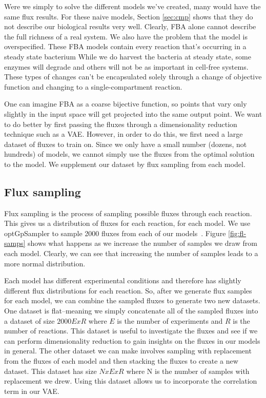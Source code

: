 Were we simply to solve the different models we've created, many would have the same flux results.
For these naive models, Section \ref{sec:cmp} shows that they do not describe our biological results very well.
Clearly, FBA alone cannot describe the full richness of a real system.
We also have the problem that the model is overspecified.
These FBA models contain every reaction that's occurring in a steady state bacterium
While we do harvest the bacteria at steady state, some enzymes will degrade and others will not be as important in cell-free systems.
These types of changes can't be encapsulated solely through a change of objective function and changing to a single-compartment reaction.

One can imagine FBA as a coarse bijective function, so points that vary only slightly in the input space will get projected into the same output point.
We want to do better by first passing the fluxes through a dimensionality reduction technique such as a VAE.
However, in order to do this, we first need a large dataset of fluxes to train on.
Since we only have a small number (dozens, not hundreds) of models, we cannot simply use the fluxes from the optimal solution to the model.
We supplement our dataset by flux sampling from each model.

\subsection{Flux sampling}
Flux sampling is the process of sampling possible fluxes through each reaction.
This gives us a distribution of fluxes for each reaction, for each model.
We use optGpSampler to sample 2000 fluxes from each of our models~\cite{megchelenbrink2014optgpsampler}.
Figure \ref{fig:fl-samps} shows what happens as we increase the number of samples we draw from each model.
Clearly, we can see that increasing the number of samples leads to a more normal distribution.


Each model has different experimental conditions and therefore has slightly different flux distributions for each reaction.
So, after we generate flux samples for each model, we can combine the sampled fluxes to generate two new datasets.
One dataset is flat--meaning we simply concatenate all of the sampled fluxes into a dataset of size $2000E x R$ where $E$ is the number of experiments and $R$ is the number of reactions.
This dataset is useful to investigate the fluxes and see if we can perform dimensionality reduction to gain insights on the fluxes in our models in general.
The other dataset we can make involves sampling with replacement from the fluxes of each model and then stacking the fluxes to create a new dataset.
This dataset has size $N x E x R$ where N is the number of samples with replacement we drew.
Using this dataset allows us to incorporate the correlation term in our VAE.

